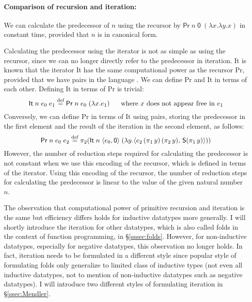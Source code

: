\paragraph{Comparison of recursion and iteration:}
We can calculate the predecessor of $n$ using the recursor
by $\mathsf{Pr}\;n\;\mathsf{0}\;(\lambda x.\lambda y.x)$ in constant time,
provided that $n$ is in canonical form.

Calculating the predecessor using the iterator is not as simple as using
the recursor, since we can no longer directly refer to the predecessor
in iteration. It is known that the iterator \textsf{It} has
the same computational power as the recursor \textsf{Pr},
provided that we have pairs in the language \cite{AlvFerFloMac10}.
We can define \textsf{Pr} and \textsf{It} in terms of each other.
Defining \textsf{It} in terms of \textsf{Pr} is trivial:
\[ \mathsf{It}\;n\;e_0\;e_1 \stackrel{\text{def}}{=} \mathsf{Pr}\;n\;e_0\;(\lambda x.e_1)
   ~~~~~\text{where $x$ does not appear free in $e_1$} \]
Conversely, we can define \textsf{Pr} in terms of \textsf{It} using pairs,
storing the predecessor in the first element and
the result of the iteration in the second element, as follows:
\[ \mathsf{Pr}\;n\;e_0\;e_2 \stackrel{\text{def}}{=}
 \pi_2(\mathsf{It}\;n\;\langle e_0,\mathsf{0}\rangle\;
  (\lambda y.\langle e_2\,(\pi_1\,y)\,(\pi_2\,y),\,\textsf{S}(\pi_1\,y)\rangle))
\]
However, the number of reduction steps required for calculating the predecessor
is not constant when we use this encoding of the recursor, which is defined
in terms of the iterator. Using this encoding of the recursor, the number of
reduction steps for calculating the predecessor is linear to the value of
the given natural number $n$.

The observation that computational power of primitive recursion and iteration
is the same but efficiency differs holds for inductive datatypes more generally.
I will shortly introduce the iteration for other datatypes, which is also called
folds in the context of function programming, in \S\ref{sssec:folds}.
However, for non-inductive datatypes, especially for negative datatypes, this
observation no longer holds. In fact, iteration needs to be formulated in a
different style since popular style of formulating folds only generalize to
limited class of inductive types (\ie not even all inductive datatypes, not to
mention of non-inductive datatypes such as negative datatypes). I will introduce
two different styles of formulating iteration in \S\ref{ssec:Mendler}.

